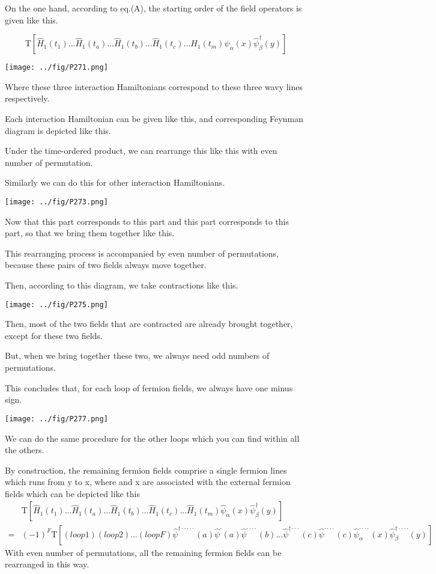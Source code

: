 On the one hand, according to eq.(A), the starting order of the field operators is given like this.

$$\mathrm{T}[\hat H_1(t_1)...\hat H_1(t_a)...\hat H_1(t_b)...\hat H_1(t_c)...\hat H_1(t_m)\hat \psi_{\alpha}(x)\hat \psi_{\beta}^{\dagger}(y)]$$
\begin{center}
\texttt{[image: ../fig/P271.png]}
\end{center}
Where these three interaction Hamiltonians correspond to these three wavy lines respectively.

Each interaction Hamiltonian can be given like this, and corresponding Feynman diagram is depicted like this.

Under the time-ordered product, we can rearrange this like this with even number of permutation.

Similarly we can do this for other interaction Hamiltonians.
\begin{center}
\texttt{[image: ../fig/P273.png]}
\end{center}

Now that this part corresponds to this part and this part corresponds to this part, so that we bring them together like this.

This rearranging process is accompanied by even number of permutations, because these pairs of two fields always move together.

Then, according to this diagram, we take contractions like this.
\begin{center}
\texttt{[image: ../fig/P275.png]}
\end{center}

Then, most of the two fields that are contracted are already brought together, except for these two fields.

But, when we bring together these two, we always need odd numbers of permutations.

This concludes that, for each loop of fermion fields, we always have one minus sign.
\begin{center}
\texttt{[image: ../fig/P277.png]}
\end{center}

We can do the same procedure for the other loops which you can find within all the others.

By construction, the remaining fermion fields comprise a single fermion lines which runs from y to x, where and x are associated with the external fermion fields which can be depicted like this
\begin{align}
&\mathrm{T}[\hat H_1(t_1)...\hat H_1(t_a)...\hat H_1(t_b)...\hat H_1(t_c)...\hat H_1(t_m)\hat \psi_{\alpha}(x)\hat \psi_{\beta}^{\dagger}(y)]\nonumber \\
=&(-1)^F\mathrm{T}[(loop1)(loop2)...(loopF)\hat \psi^{\dagger\cdot\cdot\cdot\cdot\cdot}(a)\hat \psi^{\cdot}(a)\hat \psi^{\cdot\cdot\cdot\cdot}(b)...\hat \psi^{\dagger\cdot\cdot\cdot}(c)\hat \psi^{\cdot\cdot\cdot\cdot}(c)\hat \psi_{\alpha}^{\cdot\cdot\cdot\cdot}(x)\hat \psi_{\beta}^{\dagger\cdot\cdot\cdot\cdot}(y)]\nonumber
\end{align}
With even number of permutations, all the remaining fermion fields can be rearranged in this way.

